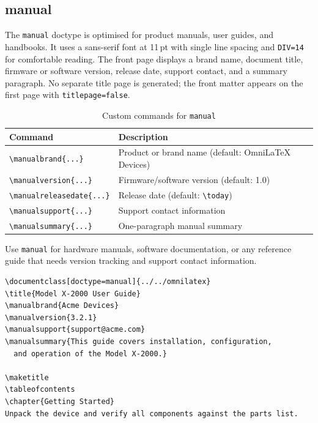\subsection{manual}

The \texttt{manual} doctype is optimised for product manuals, user guides,
and handbooks.  It uses a sans-serif font at 11\,pt with single line spacing
and \texttt{DIV=14} for comfortable reading.  The front page displays a brand
name, document title, firmware or software version, release date, support
contact, and a summary paragraph.  No separate title page is generated; the
front matter appears on the first page with \texttt{titlepage=false}.

\begin{table}[htbp]
    \centering
    \caption{Custom commands for \texttt{manual}}
    \label{tab:manual-commands}
    \begin{tabular}{@{} l p{8cm} @{}}
        \toprule
        \textbf{Command} & \textbf{Description} \\
        \midrule
        \texttt{\textbackslash manualbrand\{...\}}         & Product or brand name (default: OmniLaTeX Devices) \\
        \texttt{\textbackslash manualversion\{...\}}       & Firmware/software version (default: 1.0) \\
        \texttt{\textbackslash manualreleasedate\{...\}}   & Release date (default: \texttt{\textbackslash today}) \\
        \texttt{\textbackslash manualsupport\{...\}}       & Support contact information \\
        \texttt{\textbackslash manualsummary\{...\}}       & One-paragraph manual summary \\
        \bottomrule
    \end{tabular}
\end{table}

Use \texttt{manual} for hardware manuals, software documentation, or any
reference guide that needs version tracking and support contact information.

\begin{verbatim}
\documentclass[doctype=manual]{../../omnilatex}
\title{Model X-2000 User Guide}
\manualbrand{Acme Devices}
\manualversion{3.2.1}
\manualsupport{support@acme.com}
\manualsummary{This guide covers installation, configuration,
  and operation of the Model X-2000.}

\maketitle
\tableofcontents
\chapter{Getting Started}
Unpack the device and verify all components against the parts list.

\end{verbatim}
